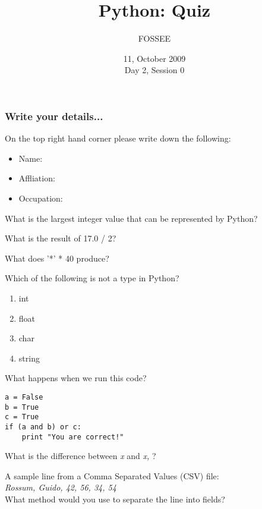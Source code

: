 \documentclass[14pt,compress]{beamer}
\title[Basic Python]{Python: Quiz}
\author[FOSSEE Team] {FOSSEE}
\institute[IIT Bombay] {Department of Aerospace Engineering\\IIT Bombay}
\date[] {11, October 2009\\Day 2, Session 0}
\newcommand{\kwrd}[1]{ \texttt{\textbf{\color{blue}{#1}}}  }
\begin{document}
\begin{frame}
  \titlepage
\end{frame}

\begin{frame}
  \frametitle{Write your details...}
On the top right hand corner please write down the following:
  \begin{itemize}
    \item  Name:
    \item Affliation:
    \item Occupation:
  \end{itemize}
\end{frame}

\begin{frame}{}
  What is the largest integer value that can be represented by Python?
\end{frame}

\begin{frame}{}
  What is the result of 17.0 / 2?
\end{frame}

\begin{frame}{}
  What does '*' * 40 produce?
\end{frame}

\begin{frame}{}
  Which of the following is not a type in Python?
  \begin{enumerate}
    \item int
    \item float
    \item char
    \item string
  \end{enumerate}
\end{frame}

\begin{frame}[fragile]{}
  What happens when we run this code?
  \begin{lstlisting}
a = False
b = True
c = True
if (a and b) or c:
    print "You are correct!"
  \end{lstlisting}
\end{frame}

\begin{frame}{}
  What is the difference between \kwrd{print} \emph{x} and \kwrd{print} \emph{x,} ?
\end{frame}

\begin{frame}{}
  A sample line from a Comma Separated Values (CSV) file:\\
  \vspace*{0.2in}
  \emph{Rossum, Guido, 42, 56, 34, 54}\\
  \vspace*{0.2in}
  What method would you use to separate the line into fields?
\end{frame}
\end{document}

